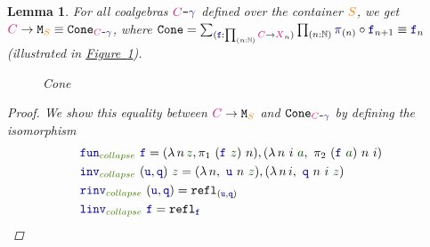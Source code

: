 \documentclass[twoside,11pt,openright]{report}
\theoremstyle{plain} %
\newtheorem{lem}[thm]{Lemma}
\theoremstyle{definition}
\theoremstyle{remark}
\newcommand*{\figref}[1]{\hyperref[fig:#1]{Figure~\ref*{fig:#1}}}
\newcommand*{\term}[1]{\textcolor{green!30!black}{#1}} %
\newcommand*{\pathterm}[1]{\textcolor{green!65!red!75!black}{#1}}
\newcommand*{\type}[1]{\textcolor{magenta!90!black}{#1}}
\newcommand*{\container}[1]{\textcolor{orange}{#1}}
\newcommand*{\coalg}[2]{#1\texttt{-}#2}
\newcommand*{\function}[1]{\textcolor{blue!60!black}{\ensuremath{\mathtt{#1}}}}
\newcommand*{\typeformer}[1]{\ensuremath{\mathtt{#1}}}
\begin{document}
\begin{lem}\label{lem:function-to-M-type-is-cone}
  For all coalgebras \(\coalg{\type{C}}{\function{\gamma}}\) defined over the container \(\container{S}\), we get \(\type{C} \rightarrow \typeformer{M}_{\container{S}} \equiv \typeformer{Cone}_{\coalg{\type{C}}{\function{\gamma}}}\), where \(\typeformer{Cone} = \sum_{(\function{f} : \prod_{(n : \mathbb{N})} \type{C} \rightarrow \type{X}_n)} \prod_{(n : \mathbb{N})} \function{\pi}_{(n)} \circ \function{f}_{n+1} \equiv \function{f}_n\) (illustrated in \figref{M-seq-cone}).
  \begin{figure}[h]
    \centering
    \caption{Cone}
    \label{fig:M-seq-cone}
  \end{figure}  
  \begin{proof}
    We show this equality between \(\type{C} \rightarrow \typeformer{M}_{\container{S}}\) and \(\typeformer{Cone}_{\coalg{\type{C}}{\function{\gamma}}}\) by defining the isomorphism
    \begin{align}
      &\function{fun}_{\pathterm{collapse}}~\function{f} = (\lambda\,n\,\term{z},\pi_1~(\function{f}~\term{z})~n),(\lambda\,n~i~\term{a},~\pi_2~(\function{f}~\term{a})~n~i) \\
      &\function{inv}_{\pathterm{collapse}}~(\function{u},\function{q})~\term{z} = (\lambda\,n,~\function{u}~n~\term{z}),(\lambda\,n\,i,~\function{q}~n~i~\term{z}) \\
      &\function{rinv}_{\pathterm{collapse}}~(\function{u},\function{q}) = \mathtt{refl}_{(\function{u},\function{q})} \\
      &\function{linv}_{\pathterm{collapse}}~\function{f} = \mathtt{refl}_{\function{f}}
    \end{align}
  \end{proof}
\end{lem}
\end{document}
